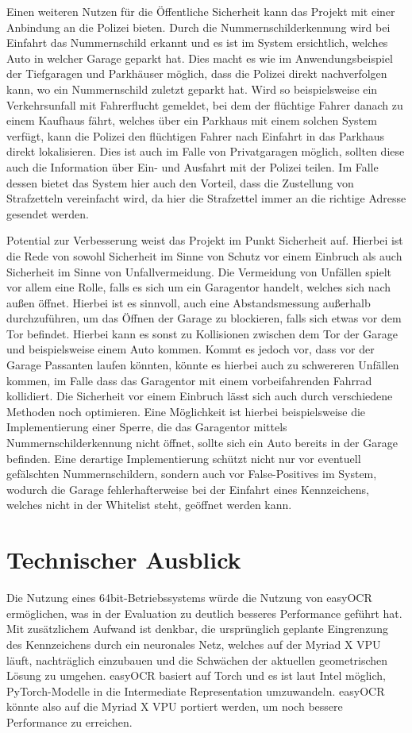 Einen weiteren Nutzen für die Öffentliche Sicherheit kann das Projekt mit einer Anbindung an die Polizei bieten. Durch die Nummernschilderkennung wird bei Einfahrt das Nummernschild erkannt und es ist im System ersichtlich, welches Auto in welcher Garage geparkt hat. Dies macht es wie im Anwendungsbeispiel der Tiefgaragen und Parkhäuser möglich, dass die Polizei direkt nachverfolgen kann, wo ein Nummernschild zuletzt geparkt hat. Wird so beispielsweise ein Verkehrsunfall mit Fahrerflucht gemeldet, bei dem der flüchtige Fahrer danach zu einem Kaufhaus fährt, welches über ein Parkhaus mit einem solchen System verfügt, kann die Polizei den flüchtigen Fahrer nach Einfahrt in das Parkhaus direkt lokalisieren. Dies ist auch im Falle von Privatgaragen möglich, sollten diese auch die Information über Ein- und Ausfahrt mit der Polizei teilen. Im Falle dessen bietet das System hier auch den Vorteil, dass die Zustellung von Strafzetteln vereinfacht wird, da hier die Strafzettel immer an die richtige Adresse gesendet werden.

Potential zur Verbesserung weist das Projekt im Punkt Sicherheit auf. Hierbei ist die Rede von sowohl Sicherheit im Sinne von Schutz vor einem Einbruch als auch Sicherheit im Sinne von Unfallvermeidung. Die Vermeidung von Unfällen spielt vor allem eine Rolle, falls es sich um ein Garagentor handelt, welches sich nach außen öffnet. Hierbei ist es sinnvoll, auch eine Abstandsmessung außerhalb durchzuführen, um das Öffnen der Garage zu blockieren, falls sich etwas vor dem Tor befindet. Hierbei kann es sonst zu Kollisionen zwischen dem Tor der Garage und beispielsweise einem Auto kommen. Kommt es jedoch vor, dass vor der Garage Passanten laufen könnten, könnte es hierbei auch zu schwereren Unfällen kommen, im Falle dass das Garagentor mit einem vorbeifahrenden Fahrrad kollidiert.
Die Sicherheit vor einem Einbruch lässt sich auch durch verschiedene Methoden noch optimieren. Eine Möglichkeit ist hierbei beispielsweise die Implementierung einer Sperre, die das Garagentor mittels Nummernschilderkennung nicht öffnet, sollte sich ein Auto bereits in der Garage befinden. Eine derartige Implementierung schützt nicht nur vor eventuell gefälschten Nummernschildern, sondern auch vor False-Positives im System, wodurch die Garage fehlerhafterweise bei der Einfahrt eines Kennzeichens, welches nicht in der Whitelist steht, geöffnet werden kann. 


\chapter{Technischer Ausblick}
Die Nutzung eines 64bit-Betriebssystems würde die Nutzung von easyOCR ermöglichen, was in der Evaluation zu deutlich besseres Performance geführt hat.
Mit zusätzlichem Aufwand ist denkbar, die ursprünglich geplante Eingrenzung des Kennzeichens durch ein neuronales Netz, welches auf der Myriad X VPU läuft, nachträglich einzubauen und die Schwächen der aktuellen geometrischen Lösung zu umgehen.
easyOCR basiert auf Torch und es ist laut Intel möglich, PyTorch-Modelle in die Intermediate Representation umzuwandeln.
easyOCR könnte also auf die Myriad X VPU portiert werden, um noch bessere Performance zu erreichen.
